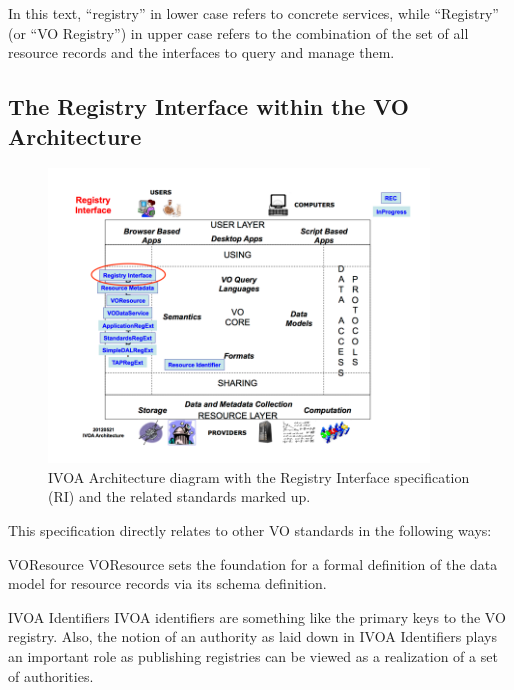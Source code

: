 \documentclass{ivoa}
\begin{document}
In this text, ``registry'' in lower case refers to concrete services,
while ``Registry'' (or ``VO Registry'') in upper case refers to the
combination of the set of all resource records and the interfaces to
query and manage them.

\subsection{The Registry Interface within the VO Architecture}

\label{sect:rolewithinivoa}


\begin{figure}[th]
\begin{center}
\includegraphics[width=0.9\textwidth]{archdiag.png}
\caption{IVOA Architecture
diagram with the Registry Interface specification (RI) and
the related standards marked up.}
\label{fig:arch}
\end{center}
\end{figure}

This specification directly relates to other VO standards in the
following ways:


\begin{bigdescription}
\item[VOResource \citep{std:VOR}]VOResource sets the foundation for a
formal definition of the data model for resource records via its schema
definition.

\item[IVOA Identifiers \citep{std:VOID2}]IVOA identifiers are something like
the primary keys to the VO registry.  Also, the notion of an authority as
laid down in IVOA Identifiers plays an important role as publishing
registries can be viewed as a realization of a set of authorities.

\end{bigdescription}
\end{document}
